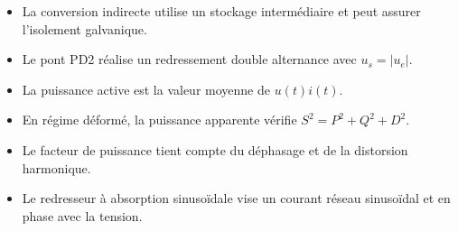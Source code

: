\begin{itemize}
\item La conversion indirecte utilise un stockage intermédiaire et peut assurer l'isolement galvanique.
\item Le pont PD2 réalise un redressement double alternance avec $u_s=|u_e|$.
\item La puissance active est la valeur moyenne de $u(t)i(t)$.
\item En régime déformé, la puissance apparente vérifie $S^2=P^2+Q^2+D^2$.
\item Le facteur de puissance tient compte du déphasage et de la distorsion harmonique.
\item Le redresseur à absorption sinusoïdale vise un courant réseau sinusoïdal et en phase avec la tension.
\end{itemize}
